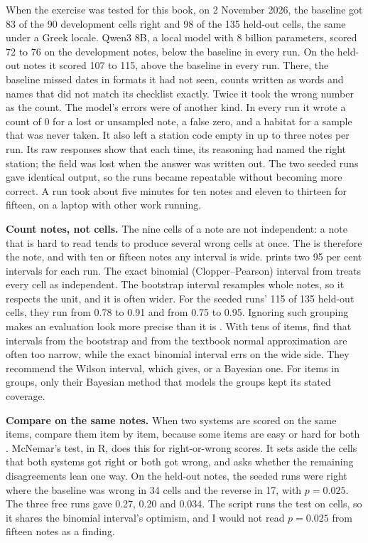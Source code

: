 When the exercise was tested for this book, on 2 November 2026, the baseline
got 83 of the 90 development cells right and 98 of the 135 held-out cells, the
same under a Greek locale. Qwen3 8B, a local model with 8 billion parameters,
scored 72 to 76 on the development notes, below the baseline in every run. On
the held-out notes it scored 107 to 115, above the baseline in every run.
There, the baseline missed dates in formats it had not seen, counts written as
words and names that did not match its checklist exactly. Twice it took the
wrong number as the count. The model's errors were of another kind. In every
run it wrote a count of 0 for a lost or unsampled note, a false zero, and a
habitat for a sample that was never taken. It also left a station code empty in
up to three notes per run. Its raw responses show that each time, its
reasoning had named the right station; the field was lost when the answer was
written out. The two seeded runs gave identical output, so the runs became
repeatable without becoming more correct. A run took about five minutes for ten
notes and eleven to thirteen for fifteen, on a laptop with other work running.

\textbf{Count notes, not cells.} The nine cells of a note are not independent:
a note that is hard to read tends to produce several wrong cells at once. The
 is therefore the note, and with ten or fifteen notes
any interval is wide.  prints two 95 per cent intervals for
each run. The exact binomial (Clopper--Pearson) interval from
 treats every cell as independent. The bootstrap interval resamples whole notes, so it
respects the unit, and it is often wider. For the seeded runs' 115 of 135
held-out cells, they run from 0.78 to 0.91 and from 0.75 to 0.95. Ignoring
such grouping makes an evaluation look more precise than it is
\parencite{miller2024errorbars}. With tens of items, \textcite{bowyer2025clt}
find that intervals from the bootstrap and from the textbook normal
approximation are often too narrow, while the exact binomial interval errs on
the wide side. They recommend the Wilson interval, which
 gives, or a Bayesian one. For items in
groups, only their Bayesian method that models the groups kept its stated
coverage.

\textbf{Compare on the same notes.} When two systems are scored on the same
items, compare them item by item, because some items are easy or hard for both
\parencite{miller2024errorbars}. McNemar's test,  in R,
does this for right-or-wrong scores. It sets aside the cells that both systems
got right or both got wrong, and asks whether the remaining disagreements lean
one way. On the held-out notes, the seeded runs were right where the baseline
was wrong in 34 cells and the reverse in 17, with $p = 0.025$. The three free
runs gave 0.27, 0.20 and 0.034. The script runs the test on cells, so it
shares the binomial interval's optimism, and I would not read $p = 0.025$ from
fifteen notes as a finding.

